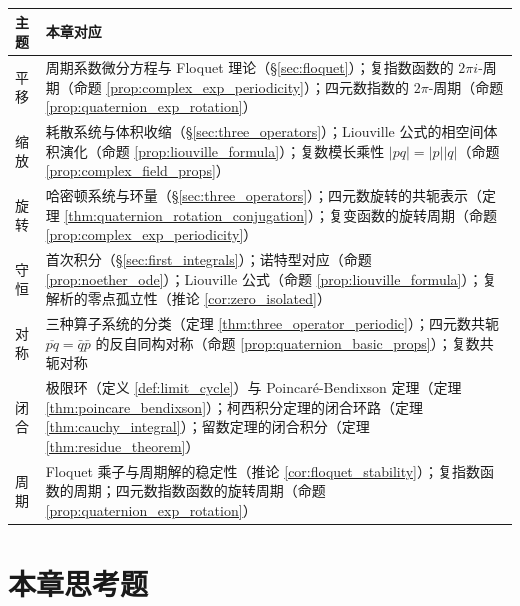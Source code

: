 \begin{center}
\begin{tabular}{>{\centering\arraybackslash}p{2.2cm}>{\centering\arraybackslash}p{10.5cm}}
\toprule
主题 & 本章对应 \\
\midrule
平移 & 周期系数微分方程与 Floquet 理论（\S\ref{sec:floquet}）；复指数函数的 $2\pi i$-周期（命题 \ref{prop:complex_exp_periodicity}）；四元数指数的 $2\pi$-周期（命题 \ref{prop:quaternion_exp_rotation}） \\
缩放 & 耗散系统与体积收缩（\S\ref{sec:three_operators}）；Liouville 公式的相空间体积演化（命题 \ref{prop:liouville_formula}）；复数模长乘性 $|pq| = |p||q|$（命题 \ref{prop:complex_field_props}） \\
旋转 & 哈密顿系统与环量（\S\ref{sec:three_operators}）；四元数旋转的共轭表示（定理 \ref{thm:quaternion_rotation_conjugation}）；复变函数的旋转周期（命题 \ref{prop:complex_exp_periodicity}） \\
守恒 & 首次积分（\S\ref{sec:first_integrals}）；诺特型对应（命题 \ref{prop:noether_ode}）；Liouville 公式（命题 \ref{prop:liouville_formula}）；复解析的零点孤立性（推论 \ref{cor:zero_isolated}） \\
对称 & 三种算子系统的分类（定理 \ref{thm:three_operator_periodic}）；四元数共轭 $\overline{pq} = \bar q \bar p$ 的反自同构对称（命题 \ref{prop:quaternion_basic_props}）；复数共轭对称 \\
闭合 & 极限环（定义 \ref{def:limit_cycle}）与 Poincaré-Bendixson 定理（定理 \ref{thm:poincare_bendixson}）；柯西积分定理的闭合环路（定理 \ref{thm:cauchy_integral}）；留数定理的闭合积分（定理 \ref{thm:residue_theorem}） \\
周期 & Floquet 乘子与周期解的稳定性（推论 \ref{cor:floquet_stability}）；复指数函数的周期；四元数指数函数的旋转周期（命题 \ref{prop:quaternion_exp_rotation}） \\
\bottomrule
\end{tabular}
\end{center}

\section*{本章思考题}

